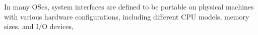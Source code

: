 In many OSes, system interfaces are defined to be portable on physical machines
with various hardware configurations,
including different CPU models, memory sizes, and I/O devices,
